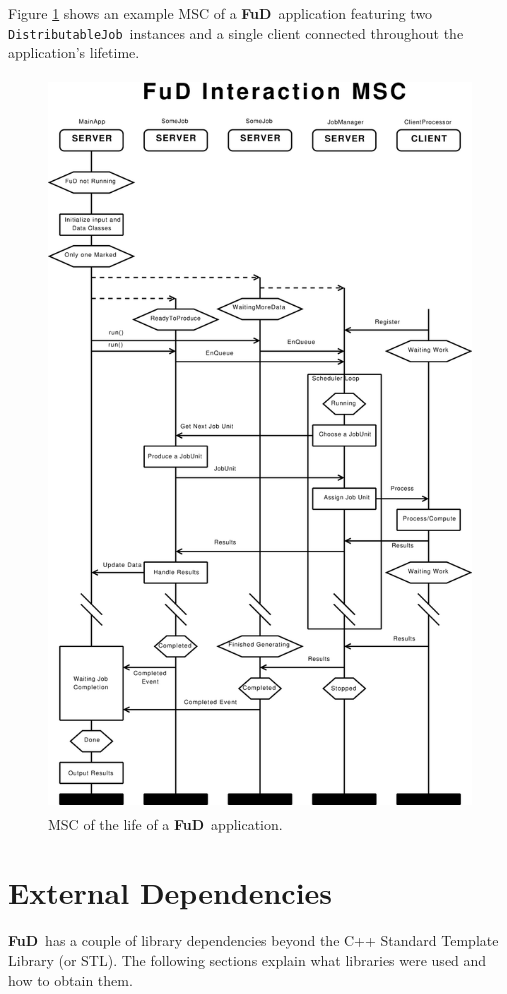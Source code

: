 \documentclass[a4paper,12pt,english]{report}
\newcommand{\fud}{\textbf{FuD}}
\renewcommand{\DJ}{\texttt{DistributableJob}}
\begin{document}
Figure \ref{msc} shows an example MSC of a \fud \ application featuring two \DJ \ instances and a single client connected throughout the application's lifetime.

\begin{figure}[!ht]
\begin{center}
\includegraphics [height=19.4cm]{images/jm-interaction.eps}
\end{center}
\caption{MSC of the life of a \fud \ application.}
\label{msc}
\end{figure}


\section{External Dependencies}

\fud \ has a couple of library dependencies beyond the C++ Standard Template Library (or STL). The following sections explain what libraries were used and how to obtain them.
\end{document}
